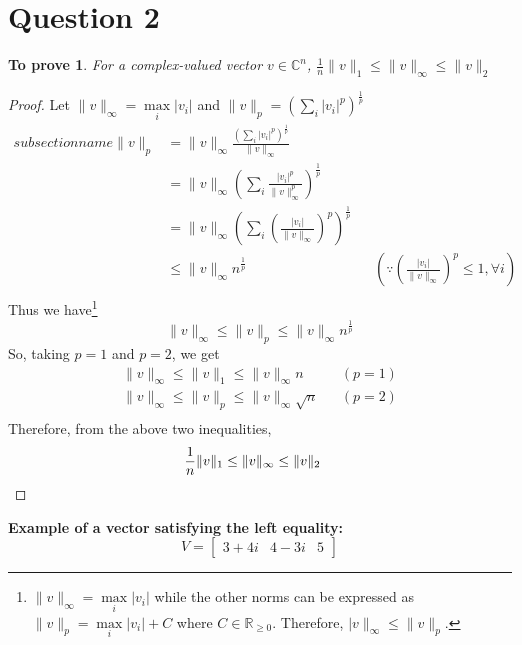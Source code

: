\documentclass[11pt, oneside]{article}
\newtheorem*{remark}{To prove}
\begin{document}
\section*{Question 2}
  \begin{remark}
    For a complex-valued vector $v \in \mathbb{C}^n$, $\frac{1}{n}\|v\|_1 \leq \|v\|_{\infty} \leq \|v\|_2$
  \end{remark}
  \begin{proof}
    Let $\|v\|_{\infty} = \max\limits_i |v_i|$ and $\|v\|_p = \left(\sum\limits_i |v_i|^p \right)^{\frac{1}{p}}$
    \begin{align*}subsection name
      \|v\|_p &= \|v\|_{\infty} \frac{\left(\sum_i |v_i|^p\right)^{\frac{1}{p}}}{\|v\|_{\infty}} \\
              &= \|v\|_{\infty} \left(\sum_i\frac{|v_i|^p}{\|v\|_{\infty}^p}\right)^{\frac{1}{p}} \\
              &= \|v\|_{\infty} \left(\sum_i \left(\frac{|v_i|}{\|v\|_{\infty}}\right)^{p}\right)^{\frac{1}{p}} \\
              &\leq \|v\|_{\infty} n^{\frac{1}{p}} && \left(\because \left(\frac{|v_i|}{\|v\|_{\infty}}\right)^p \leq 1, \forall i\right) \\
    \end{align*}
    Thus we have\footnote{$\|v\|_{\infty} = \max\limits_i |v_i|$ while the other norms can be expressed as $\|v\|_{p} = \max\limits_i |v_i| + C$ where $C \in \mathbb{R}_{\ge 0}$. Therefore, $|v\|_{\infty} \leq \|v\|_{p}$.}
    \begin{equation*}
      \|v\|_{\infty} \leq \|v\|_{p} \leq \|v\|_{\infty} n^{\frac{1}{p}}
    \end{equation*}
    So, taking $p=1$ and $p=2$, we get
    \begin{align*}
      \|v\|_{\infty} \leq \|v\|_{1} \leq \|v\|_{\infty} n && (p=1)\\
      \|v\|_{\infty} \leq \|v\|_{p} \leq \|v\|_{\infty} \sqrt{n} && (p=2)\\
    \end{align*}
    Therefore, from the above two inequalities,
    \begin{align*}
      \frac{1}{n}\|v\|_1 \leq \|v\|_{\infty} \leq \|v\|_2 && \qedhere
    \end{align*}
  \end{proof}

  \noindent\textbf{Example of a vector satisfying the left equality:} \begin{equation*}
    V = \begin{bmatrix}
      3 + 4 i & 4 - 3 i & 5
  \end{bmatrix}
  \end{equation*}
\end{document}

